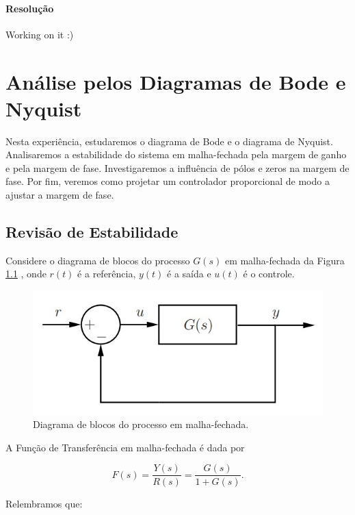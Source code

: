 \documentclass[
]{book}
\theoremstyle{definition}
\theoremstyle{definition}
\theoremstyle{definition}
\theoremstyle{remark}
\begin{document}
\hypertarget{resoluuxe7uxe3o-33}{%
\subsubsection*{Resolução}\label{resoluuxe7uxe3o-33}}

Working on it :)

\hypertarget{lab10}{%
\chapter{Análise pelos Diagramas de Bode e Nyquist}\label{lab10}}

Nesta experiência, estudaremos o diagrama de Bode e o diagrama de Nyquist. Analisaremos a estabilidade do sistema em malha-fechada pela margem de ganho e pela margem de fase. Investigaremos a influência de pólos e zeros na margem de fase. Por fim, veremos como projetar um controlador proporcional de modo a ajustar a margem de fase.

\hypertarget{revisuxe3o-de-estabilidade}{%
\section{Revisão de Estabilidade}\label{revisuxe3o-de-estabilidade}}

Considere o diagrama de blocos do processo \(G(s)\) em malha-fechada da Figura \ref{fig:fig10A1} , onde \(r(t)\) é a referência, \(y(t)\) é a saída e \(u(t)\) é o controle.

\begin{figure}

{\centering \includegraphics[width=0.5\linewidth]{Imagens/Lab10/Apresentação/fig1} 

}

\caption{Diagrama de blocos do processo em malha-fechada.}\label{fig:fig10A1}
\end{figure}

A Função de Transferência em malha-fechada é dada por

\[
F(s) = \frac{Y(s)}{R(s)} = \frac{G(s)}{1+G(s)}.
\label{eq:eq101}
\]

Relembramos que:
\end{document}
